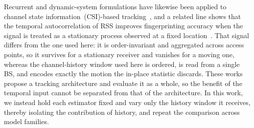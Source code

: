 Recurrent and dynamic-system formulations have likewise been applied to channel state information~(CSI)-based tracking~\cite{fang2010dynamic,yu2020rnn,shi2018tracking}, and a related line shows that the temporal autocorrelation of RSS improves fingerprinting accuracy when the signal is treated as a stationary process observed at a fixed location~\cite{wang2016temporal,tian2018temporal}. That signal differs from the one used here: it is order-invariant and aggregated across access points, so it survives for a stationary receiver and vanishes for a moving one, whereas the channel-history window used here is ordered, is read from a single BS, and encodes exactly the motion the in-place statistic discards. These works propose a tracking architecture and evaluate it as a whole, so the benefit of the temporal input cannot be separated from that of the architecture. In this work, we instead hold each estimator fixed and vary only the history window it receives, thereby isolating the contribution of history, and repeat the comparison across model families.
